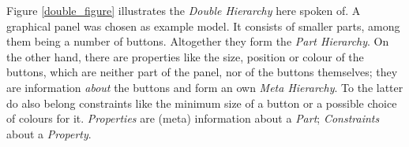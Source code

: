 Figure \ref{double_figure} illustrates the \emph{Double Hierarchy} here
spoken of. A graphical panel was chosen as example model. It consists of
smaller parts, among them being a number of buttons. Altogether they form the
\emph{Part Hierarchy}. On the other hand, there are properties like the size,
position or colour of the buttons, which are neither part of the panel, nor of
the buttons themselves; they are information \emph{about} the buttons and form
an own \emph{Meta Hierarchy}. To the latter do also belong constraints like the
minimum size of a button or a possible choice of colours for it.
\emph{Properties} are (meta) information about a \emph{Part};
\emph{Constraints} about a \emph{Property}.
